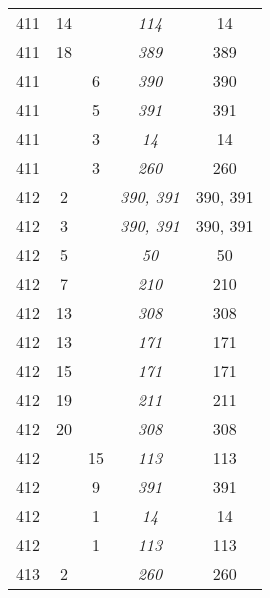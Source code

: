 \documentclass[a4paper,11pt]{article}
\numberwithin{equation}{section}
\begin{document}
\begin{center}
\begin{tabular}{|c|c|c|c|c|}
    411 & 14 & & \textit{114} & 14 \\
    411 & 18 & & \textit{389} & 389 \\
    411 & &  6 & \textit{390} & 390 \\
    411 & &  5 & \textit{391} & 391 \\
    411 & &  3 & \textit{14}  & 14 \\
    411 & &  3 & \textit{260} & 260 \\
    412 &  2 & & \textit{390, 391} & 390, 391 \\
    412 &  3 & & \textit{390, 391} & 390, 391 \\
    412 &  5 & & \textit{50}  & 50 \\
    412 &  7 & & \textit{210} & 210 \\
    412 & 13 & & \textit{308} & 308 \\
    412 & 13 & & \textit{171} & 171 \\
    412 & 15 & & \textit{171} & 171 \\
    412 & 19 & & \textit{211} & 211 \\
    412 & 20 & & \textit{308} & 308 \\
    412 & & 15 & \textit{113} & 113 \\
    412 & &  9 & \textit{391} & 391 \\
    412 & &  1 & \textit{14}  & 14 \\
    412 & &  1 & \textit{113} & 113 \\
    413 &  2 & & \textit{260} & 260 \\
    \hline
  \end{tabular}






\end{center}
\end{document}
